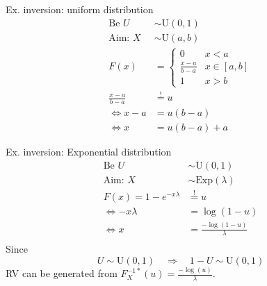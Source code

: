 \begin{vbframe}{Ex. inversion: uniform distribution}
\begin{align*}
\text{Be } U&\sim \text{U}(0,1)\\
\text{Aim: } X&\sim \text{U}(a,b)\\
F(x) &=
\begin{cases}
0 & x < a\\
\frac{x-a}{b-a} &x\in [a,b]\\
1 & x > b
\end{cases}\\
\frac{x-a}{b-a} &\overset{!}{=} u\\
\Leftrightarrow x-a &= u(b-a)\\
\Leftrightarrow x &= u(b-a)+a
\end{align*}
\end{vbframe}


\begin{vbframe}{Ex. inversion: Exponential distribution}
\begin{align*}
\text{Be } U&\sim \text{U}(0,1)\\
\text{Aim: } X&\sim\mathrm{Exp}(\lambda)\\
F(x) = 1-e^{-x\lambda} &\overset{!}{=} u\\
\Leftrightarrow -x\lambda &= \log(1-u)\\
\Leftrightarrow x &= \frac{-\log(1-u)}\lambda\\
\end{align*}
Since
$$
  U \sim \text{U}(0,1) \quad\Rightarrow\quad 1-U \sim \text{U}(0,1)
$$
RV can be generated from $F_X^{-1*}(u)=\frac{-\log(u)}\lambda$.
\end{vbframe}


%
%

